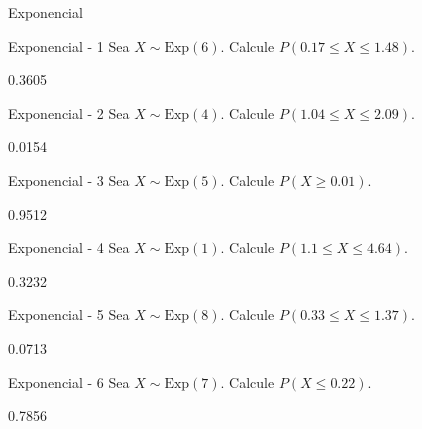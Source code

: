 \documentclass[a4,11pt]{aleph-notas}
\newcommand{\Exp}{\text{Exp}}
\begin{document}
\begin{quiz}{Exponencial}

\begin{numerical}[tolerance=0.001]%
    {Exponencial - 1}
    Sea \( X \sim \Exp(6) \). Calcule \( P(0.17 \leq X \leq 1.48) \).
    \item[] 0.3605
\end{numerical}

\begin{numerical}[tolerance=0.001]%
    {Exponencial - 2}
    Sea \( X \sim \Exp(4) \). Calcule \( P(1.04 \leq X \leq 2.09) \).
    \item[] 0.0154
\end{numerical}

\begin{numerical}[tolerance=0.001]%
    {Exponencial - 3}
    Sea \( X \sim \Exp(5) \). Calcule \( P(X \geq 0.01) \).
    \item[] 0.9512
\end{numerical}

\begin{numerical}[tolerance=0.001]%
    {Exponencial - 4}
    Sea \( X \sim \Exp(1) \). Calcule \( P(1.1 \leq X \leq 4.64) \).
    \item[] 0.3232
\end{numerical}

\begin{numerical}[tolerance=0.001]%
    {Exponencial - 5}
    Sea \( X \sim \Exp(8) \). Calcule \( P(0.33 \leq X \leq 1.37) \).
    \item[] 0.0713
\end{numerical}

\begin{numerical}[tolerance=0.001]%
    {Exponencial - 6}
    Sea \( X \sim \Exp(7) \). Calcule \( P(X \leq 0.22) \).
    \item[] 0.7856
\end{numerical}


\end{quiz}
\end{document}
